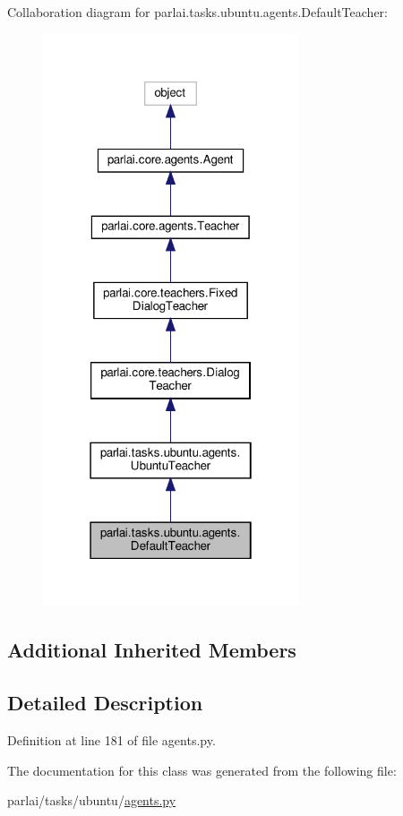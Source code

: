 Collaboration diagram for parlai.\+tasks.\+ubuntu.\+agents.\+Default\+Teacher\+:
\nopagebreak
\begin{figure}[H]
\begin{center}
\leavevmode
\includegraphics[width=214pt]{dc/d02/classparlai_1_1tasks_1_1ubuntu_1_1agents_1_1DefaultTeacher__coll__graph}
\end{center}
\end{figure}
\subsection*{Additional Inherited Members}


\subsection{Detailed Description}


Definition at line 181 of file agents.\+py.



The documentation for this class was generated from the following file\+:\begin{DoxyCompactItemize}
\item 
parlai/tasks/ubuntu/\hyperlink{parlai_2tasks_2ubuntu_2agents_8py}{agents.\+py}\end{DoxyCompactItemize}
